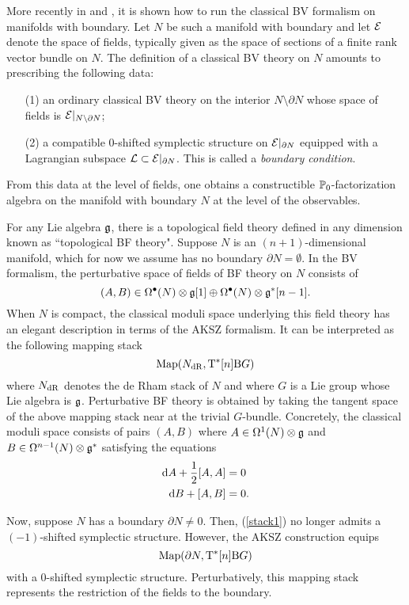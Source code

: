 \documentclass[11pt]{amsart}
\numberwithin{equation}{section}
\begin{document}
More recently in \cite{ButsonYoo} and \cite{Eugene}, it is shown how to run the classical BV formalism on manifolds with boundary. 
Let $N$ be such a manifold with boundary and let $\mathcal E$ denote the space of fields, typically given as the space of sections of a finite rank vector bundle on $N$. 
The definition of a classical BV theory on $N$ amounts to prescribing the following data:
\begin{itemize}
\item[(1)]
an ordinary classical BV theory on the interior $N \setminus \partial N$ whose space of fields is $\mathcal E|_{N \setminus \partial N}$;
\item[(2)] 
a compatible $0$-shifted symplectic structure on $\mathcal E|_{\partial N}$ equipped with a Lagrangian subspace $\mathcal L \subset \mathcal E|_{\partial N}$.
This is called a {\em boundary condition}.
\end{itemize}
From this data at the level of fields, one obtains a constructible $\mathbb P_0$-factorization algebra on the manifold with boundary $N$ at the level of the observables. 

For any Lie algebra $\mathfrak g$, there is a topological field theory defined in any dimension known as ``topological BF theory". 
Suppose $N$ is an $(n+1)$-dimensional manifold, which for now we assume has no boundary $\partial N = \emptyset$. 
In the BV formalism, the perturbative space of fields of BF theory on $N$ consists of
\[
(A, B) \in \Omega^{\bullet} (N) \otimes \mathfrak g [1] \oplus \Omega^{\bullet} (N) \otimes \mathfrak g^* [n-1] .
\]
When $N$ is compact, the classical moduli space underlying this field theory has an elegant description in terms of the AKSZ formalism. 
It can be interpreted as the following mapping stack 
\begin{equation} \label{stack1}
{\rm Map}(N_{\rm dR} ,  {\rm T}^*[n] {\rm B} G)
\end{equation}
where $N_{\rm dR}$ denotes the de Rham stack of $N$ and where $G$ is a Lie group whose Lie algebra is $\mathfrak g$. 
Perturbative BF theory is obtained by taking the tangent space of the above mapping stack near at the trivial $G$-bundle.
Concretely, the classical moduli space consists of pairs $(A, B)$ where $A \in \Omega^1 (N) \otimes \mathfrak g$ and $B \in \Omega^{n-1} (N) \otimes \mathfrak g^*$ satisfying the equations
\begin{align*}
{\rm d} A + \frac12 [A,A] & = 0 \\
{\rm d} B + [A,B] & = 0 .
\end{align*}

Now, suppose $N$ has a boundary $\partial N \ne 0$.
Then, (\ref{stack1}) no longer admits a $(-1)$-shifted symplectic structure. 
However, the AKSZ construction equips 
\[
{\rm Map}(\partial N , {\rm T}^* [n] {\rm B} G)
\]
with a $0$-shifted symplectic structure. 
Perturbatively, this mapping stack represents the restriction of the fields to the boundary. 
\end{document}
